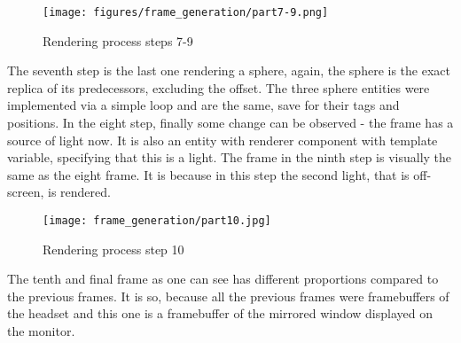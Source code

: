 \begin{figure}[H]
  \texttt{[image: figures/frame\_generation/part7-9.png]}
  \caption{Rendering process steps 7-9}
\end{figure}
The seventh step is the last one rendering a sphere, again, the sphere is the exact replica of its predecessors, excluding the offset. The three sphere entities were implemented via a simple loop and are the same, save for their tags and positions.
In the eight step, finally some change can be observed - the frame has a source of light now. It is also an entity with renderer component with template variable, specifying that this is a light.
The frame in the ninth step is visually the same as the eight frame. It is because in this step the second light, that is off-screen, is rendered.
\begin{figure}[H]
  \texttt{[image: frame\_generation/part10.jpg]}
  \caption{Rendering process step 10}
\end{figure}
The tenth and final frame as one can see has different proportions compared to the previous frames. It is so, because all the previous frames were framebuffers of the headset and this one is a framebuffer of the mirrored window displayed on the monitor.
